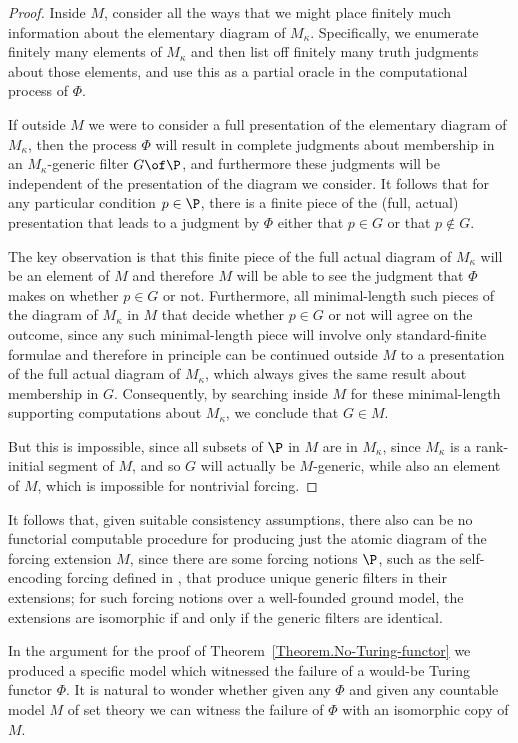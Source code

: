 \documentclass{amsart}
\begin{document}
\begin{proof}
 Inside $M$, consider all the ways that we might place finitely much information about the elementary diagram of $M_\kappa$. Specifically, we enumerate finitely many elements of $M_\kappa$ and then list off finitely many truth judgments about those elements, and use this as a partial oracle in the computational process of $\Phi$.
 
 If outside $M$ we were to consider a full presentation of the elementary diagram of $M_\kappa$, then the process $\Phi$ will result in complete judgments about membership in an $M_\kappa$-generic filter $G\of\P$, and furthermore these judgments will be independent of the presentation of the diagram we consider. It follows that for any particular condition $p\in\P$, there is a finite piece of the (full, actual) presentation that leads to a judgment by $\Phi$ either that $p\in G$ or that $p\notin G$.
 
 The key observation is that this finite piece of the full actual diagram of $M_\kappa$ will be an element of $M$ and therefore $M$ will be able to see the judgment that $\Phi$ makes on whether $p\in G$ or not. Furthermore, all minimal-length such pieces of the diagram of $M_\kappa$ in $M$ that decide whether $p\in G$ or not will agree on the outcome, since any such minimal-length piece will involve only standard-finite formulae and therefore in principle can be continued outside $M$ to a presentation of the full actual diagram of $M_\kappa$, which always gives the same result about membership in $G$. Consequently, by searching inside $M$ for these minimal-length supporting computations about $M_\kappa$, we conclude that $G\in M$.
 
 But this is impossible, since all subsets of $\P$ in $M$ are in $M_\kappa$, since $M_\kappa$ is a rank-initial segment of $M$, and so $G$ will actually be $M$-generic, while also an element of $M$, which is impossible for nontrivial forcing.
 \end{proof}
 
 It follows that, given suitable consistency assumptions, there also can be no functorial computable procedure for producing just the atomic diagram of the forcing extension $M$, since there are some forcing notions $\P$, such as the self-encoding forcing defined in \cite{FuchsHamkinsReitz2015:Set-theoreticGeology}, that produce unique generic filters in their extensions; for such forcing notions over a well-founded ground model, the extensions are isomorphic if and only if the generic filters are identical.
 
 
 In the argument for the proof of Theorem~\ref{Theorem.No-Turing-functor} we produced a specific model which witnessed the failure of a would-be Turing functor $\Phi$. It is natural to wonder whether given any $\Phi$ and given any countable model $M$ of set theory we can witness the failure of $\Phi$ with an isomorphic copy of $M$.
 
\end{document}

